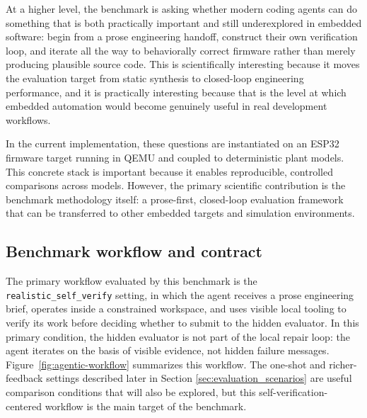 \documentclass[a4paper,fleqn]{cas-dc}
\DeclareRobustCommand{\tool}[1]{\texttt{\nolinkurl{#1}}}
\begin{document}
At a higher level, the benchmark is asking whether modern coding agents can do something that is both practically important and still underexplored in embedded software: begin from a prose engineering handoff, construct their own verification loop, and iterate all the way to behaviorally correct firmware rather than merely producing plausible source code. This is scientifically interesting because it moves the evaluation target from static synthesis to closed-loop engineering performance, and it is practically interesting because that is the level at which embedded automation would become genuinely useful in real development workflows.

In the current implementation, these questions are instantiated on an ESP32 firmware target running in QEMU \cite{systems_sim_eval} and coupled to deterministic plant models. This concrete stack is important because it enables reproducible, controlled comparisons across models. However, the primary scientific contribution is the benchmark methodology itself: a prose-first, closed-loop evaluation framework that can be transferred to other embedded targets and simulation environments.

\subsection{Benchmark workflow and contract}

The primary workflow evaluated by this benchmark is the \tool{realistic_self_verify} setting, in which the agent receives a prose engineering brief, operates inside a constrained workspace, and uses visible local tooling to verify its work before deciding whether to submit to the hidden evaluator. In this primary condition, the hidden evaluator is not part of the local repair loop: the agent iterates on the basis of visible evidence, not hidden failure messages. Figure~\ref{fig:agentic-workflow} summarizes this workflow. The one-shot and richer-feedback settings described later in Section \ref{sec:evaluation_scenarios} are useful comparison conditions that will also be explored, but this self-verification-centered workflow is the main target of the benchmark.
\end{document}
